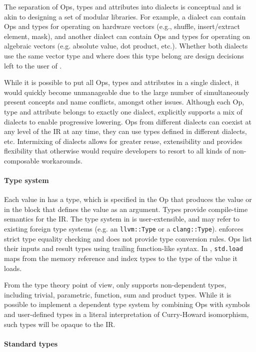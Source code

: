 The separation of Ops, types and attributes into dialects is conceptual
and is akin to designing a set of modular libraries. For example, a dialect can
contain Ops and types for operating on hardware vectors (e.g., shuffle,
insert/extract element, mask), and another dialect can contain Ops and types
for operating on algebraic vectors (e.g. absolute value, dot product, etc.).
Whether both dialects use the same vector type and where does this type belong
are design decisions left to the user of \MLIR.

While it is possible to put all Ops, types and attributes in a single dialect,
it would quickly become unmanageable due to the large number of simultaneously
present concepts and name conflicts, amongst other issues.
Although each Op, type and attribute belongs to exactly one dialect, \MLIR
explicitly supports a mix of dialects to enable progressive lowering. Ops from
different dialects can coexist at any level of the IR at any time, they can use
types defined in different dialects, etc. Intermixing of dialects allows for
greater reuse, extensibility and provides flexibility that otherwise would
require developers to resort to all kinds of non-composable workarounds.

\paragraph{Type system}

Each value in \MLIR has a type, which is specified in the Op
that produces the value or in the block that defines the value as an argument.
Types provide compile-time semantics for the IR. The type system in \MLIR is
user-extensible, and may refer to existing foreign type systems (e.g. an
\lstinline|llvm::Type| or a \lstinline|clang::Type|). \MLIR enforces strict type
equality checking and does not provide type conversion rules. Ops list their
inputs and result types using trailing function-like syntax. In ,
\lstinline|std.load| maps from the memory reference and
index types to the type of the value it loads.

From the type theory point of view, \MLIR only supports non-dependent types,
including trivial, parametric, function, sum and product types. While it is
possible to implement a dependent type system by combining Ops with
symbols and user-defined types in a literal interpretation of Curry-Howard
isomorphism, such types will be opaque to the IR.

\paragraph{Standard types}

